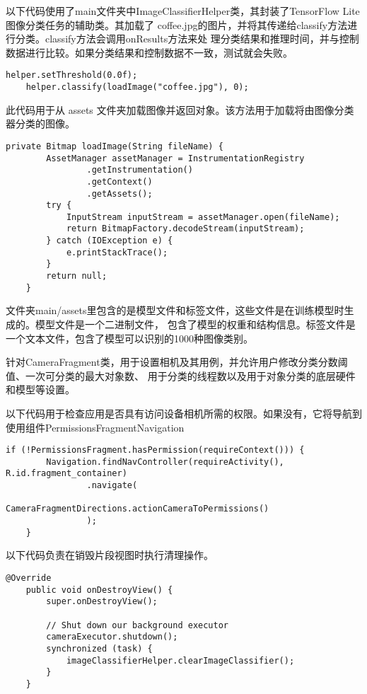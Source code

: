 以下代码使用了main文件夹中ImageClassifierHelper类，其封装了TensorFlow Lite图像分类任务的辅助类。其加载了
coffee.jpg的图片，并将其传递给classify方法进行分类。classify方法会调用onResults方法来处
理分类结果和推理时间，并与控制数据进行比较。如果分类结果和控制数据不一致，测试就会失败。
\begin{lstlisting}[style=code]
    helper.setThreshold(0.0f);
    helper.classify(loadImage("coffee.jpg"), 0);
\end{lstlisting}


此代码用于从 assets 文件夹加载图像并返回对象。该方法用于加载将由图像分类器分类的图像。
\newpage
\begin{lstlisting}[style=code]
    private Bitmap loadImage(String fileName) {
        AssetManager assetManager = InstrumentationRegistry
                .getInstrumentation()
                .getContext()
                .getAssets();
        try {
            InputStream inputStream = assetManager.open(fileName);
            return BitmapFactory.decodeStream(inputStream);
        } catch (IOException e) {
            e.printStackTrace();
        }
        return null;
    }
\end{lstlisting}

文件夹main/assets里包含的是模型文件和标签文件，这些文件是在训练模型时生成的。模型文件是一个二进制文件，
包含了模型的权重和结构信息。标签文件是一个文本文件，包含了模型可以识别的1000种图像类别。

针对CameraFragment类，用于设置相机及其用例，并允许用户修改分类分数阈值、一次可分类的最大对象数、
用于分类的线程数以及用于对象分类的底层硬件和模型等设置。

以下代码用于检查应用是否具有访问设备相机所需的权限。如果没有，它将导航到使用组件PermissionsFragment\hspace{0.5em}Navigation
\begin{lstlisting}[style=code]
    if (!PermissionsFragment.hasPermission(requireContext())) {
        Navigation.findNavController(requireActivity(), R.id.fragment_container)
                .navigate(
                        CameraFragmentDirections.actionCameraToPermissions()
                );
    }    
\end{lstlisting}

以下代码负责在销毁片段视图时执行清理操作。
\begin{lstlisting}[style=code]
    @Override
    public void onDestroyView() {
        super.onDestroyView();

        // Shut down our background executor
        cameraExecutor.shutdown();
        synchronized (task) {
            imageClassifierHelper.clearImageClassifier();
        }
    }
\end{lstlisting}

